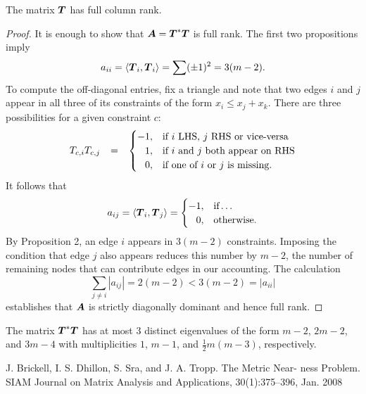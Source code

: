 \documentclass{article}
\begin{document}
\begin{proposition}
    The matrix \(\boldsymbol{T}\) has full column rank.
\end{proposition}
\begin{proof}
    It is enough to show that \(\boldsymbol{A} = \boldsymbol{T}^{\ast}\boldsymbol{T}\) is full rank.
    The first two propositions imply
    \begin{equation*}
        a_{ii}
        =
        \langle{\boldsymbol{T}_{i}, \boldsymbol{T}_{i}}\rangle
        =
        \sum (\pm 1)^{2}
        =
        3 (m-2).
    \end{equation*}
    To compute the off-diagonal entries, fix a triangle and note that two edges \(i\) and \(j\) appear in all three of its constraints of the form \(x_{i} \le x_{j} + x_{k}\).
    There are three possibilities for a given constraint \(c\):
    \begin{equation*}
        T_{c,i} T_{c,j} \mathop{\:\:\,}\nolimits = \mathop{\:\:\,}\nolimits
        \begin{cases}
            -1, &\text{if \(i\) LHS, \(j\) RHS or vice-versa} \\
            \mathop{\:\:\,}\nolimits 1,  &\text{if \(i\) and \(j\) both appear on RHS} \\
            \mathop{\:\:\,}\nolimits 0,  &\text{if one of \(i\) or \(j\) is missing}.
        \end{cases}
    \end{equation*}
    It follows that
    \begin{equation*}
        a_{ij}
        =
        \langle{\boldsymbol{T}_{i}, \boldsymbol{T}_{j}}\rangle
        =
        \begin{cases}
            -1, &\text{if}\ldots \\
            \mathop{\:\:\,}\nolimits 0, &\text{otherwise}.
        \end{cases}
    \end{equation*}
    By Proposition 2, an edge \(i\) appears in \(3 (m-2)\) constraints.
    Imposing the condition that edge \(j\) also appears reduces this number by \(m-2\), the number of remaining nodes that can contribute edges in our accounting.
    The calculation
    \begin{equation*}
        \sum_{j \neq i} |a_{ij}| = 2 (m-2) < 3 (m-2) = |a_{ii}|
    \end{equation*}
    establishes that \(\boldsymbol{A}\) is strictly diagonally dominant and hence full rank.
\end{proof}

\begin{proposition}
    The matrix \(\boldsymbol{T}^{\ast}\boldsymbol{T}\) has at most \(3\) distinct eigenvalues of the form \(m-2\), \(2m-2\), and \(3m-4\) with multiplicities \(1\), \(m-1\), and \(\frac{1}{2} m (m-3)\), respectively.
\end{proposition}

\begin{thebibliography}{99}
    J. Brickell, I. S. Dhillon, S. Sra, and J. A. Tropp. The Metric Near- ness Problem. SIAM Journal on Matrix Analysis and Applications, 30(1):375–396, Jan. 2008
\end{thebibliography}
\end{document}
